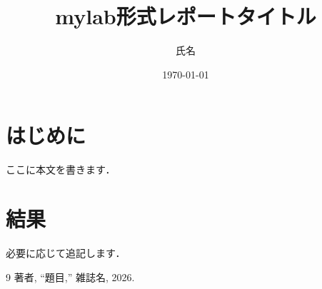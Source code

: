 \documentclass[uplatex,dvi=dvipdfmx,ja=standard,base=10pt,magstyle=nomag*,twocolumn,a4paper]{bxjsarticle}
\author{氏名}
\date{\today}
\title{mylab形式レポートタイトル}
\begin{document}
\maketitle

\section{はじめに}
ここに本文を書きます．

\section{結果}
必要に応じて追記します．

\begin{thebibliography}{9}
 著者, ``題目,'' 雑誌名, 2026.
\end{thebibliography}
\end{document}
